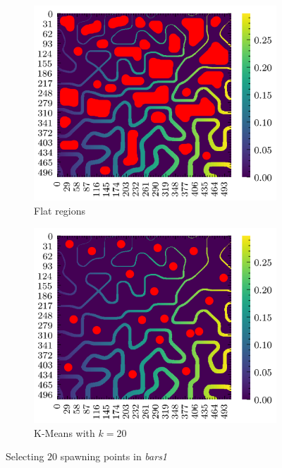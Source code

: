 \documentclass[../document.tex]{subfiles}
\begin{document}
\begin{figure}[H]
    \begin{subfigure}[b]{0.5\textwidth}
        \includegraphics[width=\textwidth]{../img/3/spawn/flat-spawn-10.png}
        \caption{Flat regions}
    \end{subfigure}
    \begin{subfigure}[b]{0.5\textwidth}
        \includegraphics[width=\textwidth]{../img/3/spawn/spawn-10.png}
        \caption{K-Means with $k=20$}
    \end{subfigure}  
\label{fig: spawn-strat}
\caption{Selecting $20$ spawning points in \emph{bars1}}    
\end{figure}
\end{document}
